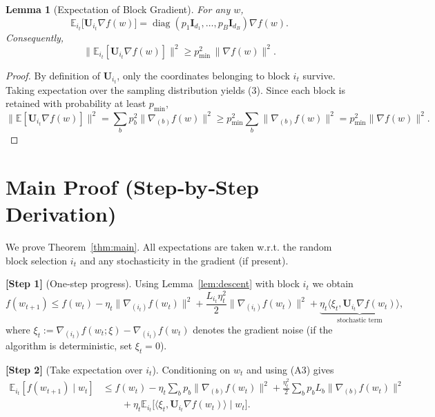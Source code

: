 \documentclass{article}
\newtheorem{lemma}{Lemma}
\newcommand{\E}{\mathbb{E}}
\begin{document}
\begin{lemma}[Expectation of Block Gradient]\label{lem:expgrad}
For any $w$,
\[
\E_{i_t}\big[\mathbf{U}_{i_t}\nabla f(w)\big]
= \operatorname{diag}(p_1\mathbf{I}_{d_1},\dots ,p_B\mathbf{I}_{d_B})\nabla f(w).
\tag{3}
\]
Consequently,
\[
\big\|\E_{i_t}[\mathbf{U}_{i_t}\nabla f(w)]\big\|^{2}
\ge p_{\min}^{2}\,\|\nabla f(w)\|^{2}.
\tag{4}
\]
\end{lemma}
\begin{proof}
By definition of $\mathbf{U}_{i_t}$, only the coordinates belonging to block $i_t$ survive.
Taking expectation over the sampling distribution yields (3).  
Since each block is retained with probability at least $p_{\min}$,
\[
\|\E[\mathbf{U}_{i_t}\nabla f(w)]\|^{2}
= \sum_{b}p_{b}^{2}\|\nabla_{(b)}f(w)\|^{2}
\ge p_{\min}^{2}\sum_{b}\|\nabla_{(b)}f(w)\|^{2}
= p_{\min}^{2}\|\nabla f(w)\|^{2}.
\]
\end{proof}

\section*{Main Proof (Step‑by‑Step Derivation)}
We prove Theorem~\ref{thm:main}.  All expectations are taken w.r.t. the random block
selection $i_t$ and any stochasticity in the gradient (if present).

\noindent\textbf{[Step 1]} (One‑step progress).  
Using Lemma~\ref{lem:descent} with block $i_t$ we obtain
\[
f(w_{t+1})
\le f(w_t)-\eta_t\|\nabla_{(i_t)}f(w_t)\|^{2}
+\frac{L_{i_t}\eta_t^{2}}{2}\|\nabla_{(i_t)}f(w_t)\|^{2}
+\underbrace{\eta_t\langle \xi_t,\mathbf{U}_{i_t}\nabla f(w_t)\rangle}_{\text{stochastic term}},
\tag{5}
\]
where $\xi_t:=\nabla_{(i_t)}f(w_t;\xi)-\nabla_{(i_t)}f(w_t)$ denotes the gradient noise
(if the algorithm is deterministic, set $\xi_t=0$).

\noindent\textbf{[Step 2]} (Take expectation over $i_t$).  
Conditioning on $w_t$ and using (A3) gives
\[
\begin{aligned}
\E_{i_t}[f(w_{t+1})\mid w_t]
&\le f(w_t)-\eta_t\sum_{b}p_b\|\nabla_{(b)}f(w_t)\|^{2}
+\frac{\eta_t^{2}}{2}\sum_{b}p_bL_b\|\nabla_{(b)}f(w_t)\|^{2}
\\
&\qquad+\eta_t\E_{i_t}\big[\langle\xi_t,\mathbf{U}_{i_t}\nabla f(w_t)\rangle\mid w_t\big].
\end{aligned}
\tag{6}
\]
\end{document}
